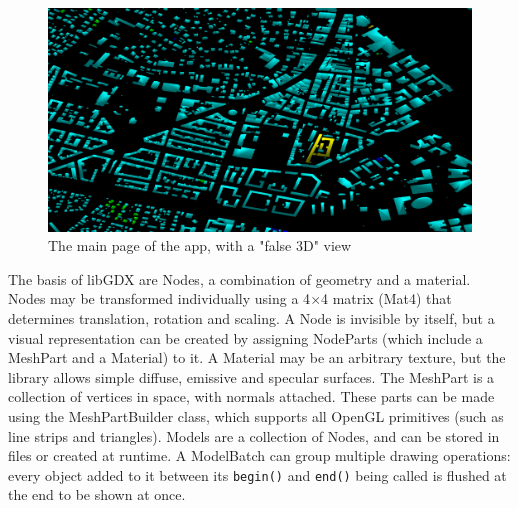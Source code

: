 \begin{figure}[!ht]
    \centering
    \includegraphics[width=150mm, keepaspectratio]{images/main_graphics_view.png}
    \caption{The main page of the app, with a "false 3D" view}
\end{figure}

The basis of libGDX are Nodes, a combination of geometry and a material. Nodes may be transformed individually using a 4$\times$4 matrix (Mat4) that determines translation, rotation and scaling. A Node is invisible by itself, but a visual representation can be created by assigning NodeParts (which include a MeshPart and a Material) to it. A Material may be an arbitrary texture, but the library allows simple diffuse, emissive and specular surfaces. The MeshPart is a collection of vertices in space, with normals attached. These parts can be made using the MeshPartBuilder class, which supports all OpenGL primitives (such as line strips and triangles). Models are a collection of Nodes, and can be stored in files or created at runtime. A ModelBatch can group multiple drawing operations: every object added to it between its \verb|begin()| and \verb|end()| being called is flushed at the end to be shown at once.


